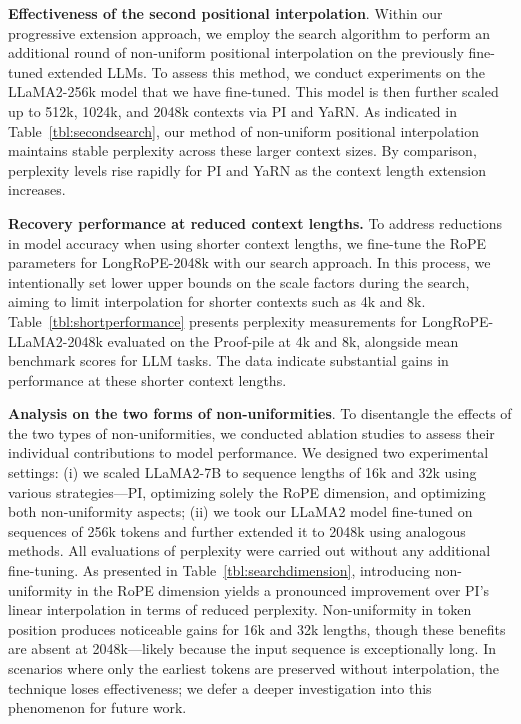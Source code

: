 \textbf{Effectiveness of the second positional interpolation}. Within our progressive extension approach, we employ the search algorithm to perform an additional round of non-uniform positional interpolation on the previously fine-tuned extended LLMs. To assess this method, we conduct experiments on the LLaMA2-256k model that we have fine-tuned. This model is then further scaled up to 512k, 1024k, and 2048k contexts via PI and YaRN. As indicated in Table~\ref{tbl:secondsearch}, our method of non-uniform positional interpolation maintains stable perplexity across these larger context sizes. By comparison, perplexity levels rise rapidly for PI and YaRN as the context length extension increases.

\textbf{Recovery performance at reduced context lengths.} To address reductions in model accuracy when using shorter context lengths, we fine-tune the RoPE parameters for LongRoPE-2048k with our search approach. In this process, we intentionally set lower upper bounds on the scale factors during the search, aiming to limit interpolation for shorter contexts such as 4k and 8k. Table~\ref{tbl:shortperformance} presents perplexity measurements for LongRoPE-LLaMA2-2048k evaluated on the Proof-pile at 4k and 8k, alongside mean benchmark scores for LLM tasks. The data indicate substantial gains in performance at these shorter context lengths.

\textbf{Analysis on the two forms of non-uniformities}. To disentangle the effects of the two types of non-uniformities, we conducted ablation studies to assess their individual contributions to model performance. We designed two experimental settings: (i) we scaled LLaMA2-7B to sequence lengths of 16k and 32k using various strategies—PI, optimizing solely the RoPE dimension, and optimizing both non-uniformity aspects; (ii) we took our LLaMA2 model fine-tuned on sequences of 256k tokens and further extended it to 2048k using analogous methods. All evaluations of perplexity were carried out without any additional fine-tuning. As presented in Table~\ref{tbl:searchdimension}, introducing non-uniformity in the RoPE dimension yields a pronounced improvement over PI’s linear interpolation in terms of reduced perplexity. Non-uniformity in token position produces noticeable gains for 16k and 32k lengths, though these benefits are absent at 2048k—likely because the input sequence is exceptionally long. In scenarios where only the earliest tokens are preserved without interpolation, the technique loses effectiveness; we defer a deeper investigation into this phenomenon for future work.

